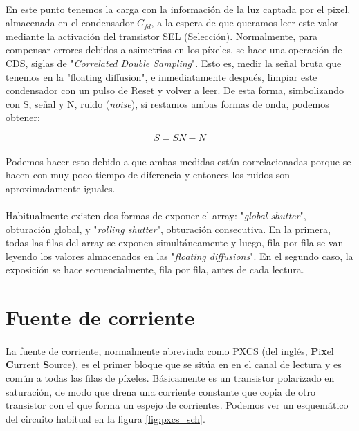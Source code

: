 \paragraph{}
En este punto tenemos la carga con la información de la luz captada por el pixel,
almacenada en el condensador $C_{fd}$, a la espera de que queramos leer este valor
mediante la activación del transistor SEL (Selección). Normalmente, para compensar
errores debidos a asimetrias en los píxeles, se hace una operación de CDS, siglas de
"\textit{Correlated Double Sampling}". Esto es, medir la señal bruta que tenemos
en la "floating diffusion", e inmediatamente después, limpiar este condensador con
un pulso de Reset y volver a leer. De esta forma, simbolizando con S, señal y N,
ruido (\textit{noise}), si restamos ambas formas de onda, podemos obtener:

\begin{equation}
	\label{eq:CDS_operation}
	S = SN - N
\end{equation}

\paragraph{}
Podemos hacer esto debido a que ambas medidas  están correlacionadas porque se
hacen con muy poco tiempo de diferencia y entonces los ruidos son aproximadamente
iguales.

\paragraph{}
Habitualmente existen dos formas de exponer el array: "\textit{global shutter}",
obturación global, y "\textit{rolling shutter}", obturación consecutiva. En la
primera, todas las filas del array se exponen simultáneamente y luego, fila por fila
se van leyendo los valores almacenados en las "\textit{floating diffusions}". En
el segundo caso, la exposición se hace secuencialmente, fila por fila, antes de cada
lectura.

\section{Fuente de corriente}\label{cap:ro_sch_pxcs}
\paragraph{}
La fuente de corriente, normalmente abreviada como PXCS (del inglés,
\textbf{P}i\textbf{x}el \textbf{C}urrent \textbf{S}ource),
es el primer bloque que se sitúa en
en el canal de lectura y es común a todas las filas de píxeles. Básicamente
es un transistor polarizado en saturación, de modo que drena una corriente
constante que copia de otro transistor con el que forma un espejo de corrientes.
Podemos ver un esquemático del circuito habitual en la figura \ref{fig:pxcs_sch}.

